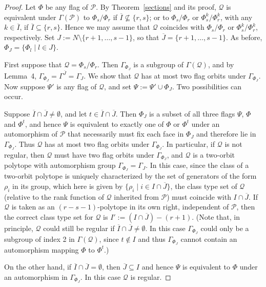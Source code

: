 \documentclass[12pt]{article}
\renewcommand{\bar}{\overline}
\renewcommand{\>}{\rangle}
\theoremstyle{definition}\newtheorem{definition}{Definition}[section]
\begin{document}
\begin{proof}
Let $\Phi$ be any flag of $\mathcal{P}$. By Theorem~\ref{sections} and its proof, $\mathcal{Q}$ is equivalent under $\Gamma(\mathcal{P})$ to $\Phi_{s}/\Phi_{r}$ if $\bar{I}\not\subseteq\{r,s\}$; or to $\Phi_{s}/\Phi_{r}$ or $\Phi_{s}^{k}/\Phi_{r}^{k}$, with any $k\in\bar{I}$, if $\bar{I}\subseteq\{r,s\}$. Hence we may assume that $\mathcal{Q}$ coincides with $\Phi_{s}/\Phi_{r}$ or $\Phi_{s}^{k}/\Phi_{r}^{k}$, respectively. Set $J:=N\setminus\{r+1,\ldots,s-1\}$, so that $\bar{J}=\{r+1,\ldots,s-1\}$. As before, $\Phi_{J}=\{\Phi_{l}\mid l \in J\}$.

First suppose that $\mathcal{Q}=\Phi_s/\Phi_r$. Then $\Gamma_{\Phi_J}$ is a subgroup of $\Gamma(\mathcal{Q})$, and by Lemma~4, $\Gamma_{\Phi_J}=\Gamma^{\bar{J}}=\Gamma_J$. We show that $\mathcal{Q}$ has at most two flag orbits under $\Gamma_{\Phi_J}$. Now suppose $\Psi'$ is any flag of $\mathcal{Q}$, and set $\Psi:=\Psi'\cup\Phi_J$. Two possibilities can occur. 

Suppose $\bar{I}\cap\bar{J}\neq\emptyset$, and let $t\in\bar{I}\cap\bar{J}$. Then $\Phi_J$ is a subset of all three flags $\Psi$, $\Phi$ and $\Phi^t$, and hence $\Psi$ is equivalent to exactly one of $\Phi$ or $\Phi^t$ under an automorphism of $\mathcal{P}$ that necessarily must fix each face in $\Phi_J$ and therefore lie in $\Gamma_{\Phi_J}$. Thus $\mathcal{Q}$ has at most two flag orbits under $\Gamma_{\Phi_J}$. In particular, if $\mathcal{Q}$ is not regular, then $\mathcal{Q}$ must have two flag orbits under $\Gamma_{\Phi_J}$, and $\mathcal{Q}$ is a two-orbit polytope with automorphism group $\Gamma_{\Phi_J}=\Gamma_{J}$. In this case, since the class of a two-orbit polytope is uniquely characterized by the set of generators of the form $\rho_i$ in its group, which here is given by $\{\rho_{i}\mid i\in I\cap\bar{J}\}$, the class type set of $\mathcal{Q}$ (relative to the rank function of $\mathcal{Q}$ inherited from $\mathcal{P}$) must coincide with $I\cap\bar{J}$. If $\mathcal{Q}$ is taken as an $(r-s-1)$-polytope in its own right, independent of $\mathcal{P}$, then the correct class type set for $\mathcal{Q}$ is $I':=(I\cap\bar{J})-(r+1)$.  (Note that, in principle, $\mathcal{Q}$ could still be regular if $\bar{I}\cap\bar{J}\neq\emptyset$. In this case $\Gamma_{\Phi_J}$ could only be a subgroup of index 2 in $\Gamma(\mathcal{Q})$, since $t\notin I$ and thus $\Gamma_{\Phi_J}$ cannot contain an automorphism mapping $\Phi$ to $\Phi^t$.)

On the other hand, if $\bar{I}\cap\bar{J}=\emptyset$, then $\bar{J}\subseteq I$ and hence $\Psi$ is equivalent to $\Phi$ under an automorphism in $\Gamma_{\Phi_J}$. In this case $\mathcal{Q}$ is regular. 


\end{proof}
\end{document}
